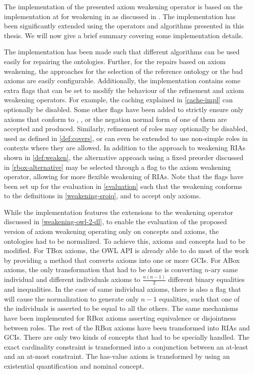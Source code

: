 
The implementation of the presented axiom weakening operator is based on the implementation at \cite{ontologyutils} for weakening in \ALC as discussed in \cite{troquard2018repairing}. The implementation has been significantly extended using the operators and algorithms presented in this thesis. We will now give a brief summary covering some implementation details.

The implementation has been made such that different algorithms can be used easily for repairing the ontologies. Further, for the repairs based on axiom weakening, the approaches for the selection of the reference ontology or the bad axioms are easily configurable. Additionally, the implementation contains some extra flags that can be set to modify the behaviour of the refinement and axiom weakening operators. For example, the caching explained in \cref{cache-impl} can optionally be disabled. Some other flags have been added to strictly ensure only axioms that conform to \ALC, \SROIQ, or the negation normal form of one of them are accepted and produced. Similarly, refinement of roles may optionally be disabled, used as defined in \cref{def:covers}, or can even be extended to use non-simple roles in contexts where they are allowed. In addition to the approach to weakening RIAs shown in \cref{def:weaken}, the alternative approach using a fixed preorder discussed in \cref{rbox-alternative} may be selected through a flag to the axiom weakening operator, allowing for more flexible weakening of RIAs. Note that the flags have been set up for the evaluation in \cref{evaluation} such that the weakening conforms to the definitions in \cref{weakening-sroiq}, and to accept only \SROIQ axioms.

While the implementation features the extensions to the weakening operator discussed in \cref{weakening-owl-2-dl}, to enable the evaluation of the proposed version of axiom weakening operating only on \SROIQ concepts and axioms, the ontologies had to be normalized. To achieve this, axioms and concepts had to be modified. For TBox axioms, the OWL API is already able to do most of the work by providing a method that converts axioms into one or more GCIs. For ABox axioms, the only transformation that had to be done is converting $n$-ary same individual and different individuals axioms to $\frac{n (n - 1)}{2}$ different binary equalities and inequalities. In the case of same individual axioms, there is also a flag that will cause the normalization to generate only $n - 1$ equalities, such that one of the individuals is asserted to be equal to all the others. The same mechanisms have been implemented for RBox axioms asserting equivalence or disjointness between roles. The rest of the RBox axioms have been transformed into RIAs and GCIs. There are only two kinds of concepts that had to be specially handled. The exact cardinality constraint is transformed into a conjunction between an at-least and an at-most constraint. The has-value axiom is transformed by using an existential quantification and nominal concept.

